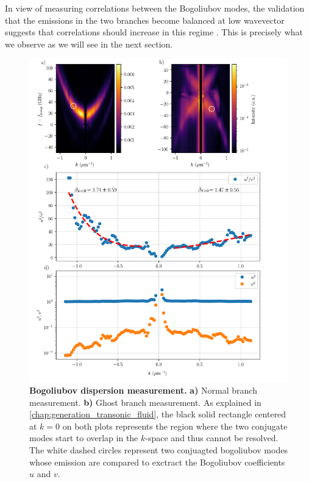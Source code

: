 In view of measuring correlations between the Bogoliubov modes, the validation that the emissions in the two branches become balanced at low wavevector suggests that correlations should increase in this regime \cite{treps_fabre_criteria_2004}. This is precisely what we observe as we will see in the next section.


\begin{figure}
    \centering
    \includegraphics[width=1\textwidth]{chap_correlation/fig/uv_analysis.pdf}
    \caption{\textbf{Bogoliubov dispersion measurement.} \textbf{a)} Normal branch measurement. \textbf{b)} Ghost branch measurement. As explained in \autoref{chap:generation_transonic_fluid}, the black solid rectangle
    centered at $k=0$ on both plots represents the region where the two conjugate modes start to overlap in the $k$-space and thus cannot be resolved. The white dashed circles represent two conjuagted bogoliubov modes whose emission are compared to exctract the Bogoliubov coefficients $u$ and $v$.}
    \label{fig:uv_analysis}
\end{figure} 


